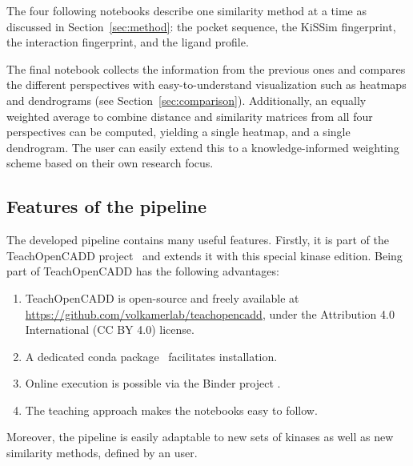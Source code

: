 \documentclass[9pt,training,ASAPversion]{livecoms}
\begin{document}
The four following notebooks describe one similarity method at a time as discussed in Section~\ref{sec:method}: the pocket sequence, the KiSSim fingerprint, the interaction fingerprint, and the ligand profile.

The final notebook collects the information from the previous ones and compares the different perspectives with easy-to-understand visualization such as heatmaps and dendrograms (see Section~\ref{sec:comparison}). Additionally, an equally weighted average to combine distance and similarity matrices from all four perspectives can be computed, yielding a single heatmap, and a single dendrogram. The user can easily extend this to a knowledge-informed weighting scheme based on their own research focus.

\subsection{Features of the pipeline}
The developed pipeline contains many useful features. Firstly, it is part of the TeachOpenCADD project~\cite{Sydow_2019_JCheminform, sydow_2022_nar} and extends it with this special kinase edition. Being part of TeachOpenCADD has the following advantages:
\begin{enumerate}
    \item TeachOpenCADD is open-source and freely available at \href{https://github.com/volkamerlab/teachopencadd}{https://github.com/volkamerlab/teachopencadd}, under the Attribution 4.0 International (CC BY 4.0) license.
    \item A dedicated conda package~\cite{conda_forge} facilitates installation.
    \item Online execution is possible via the Binder project \cite{binder_2018}.
    \item The teaching approach makes the notebooks easy to follow.
\end{enumerate}
Moreover, the pipeline is easily adaptable to new sets of kinases as well as new similarity methods, defined by an user.
\end{document}
